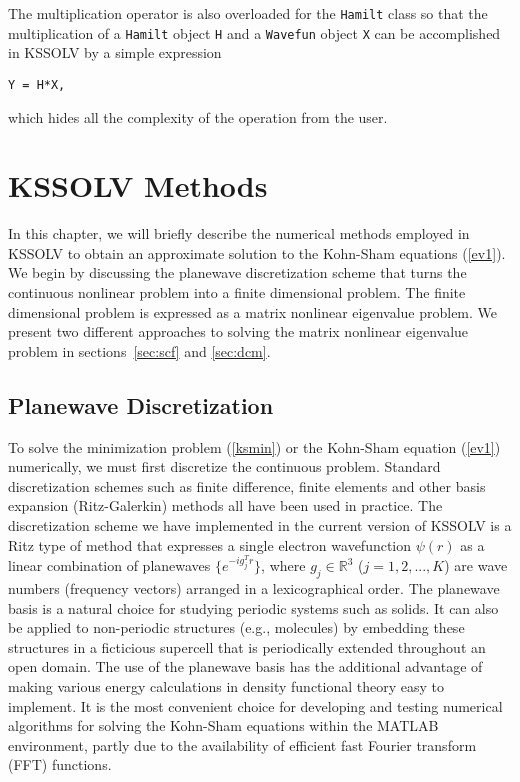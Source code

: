 \documentclass[11pt]{book}
\begin{document}
The multiplication operator is also overloaded for the {\tt Hamilt} class
so that the multiplication of a {\tt Hamilt} object {\tt H} and 
a {\tt Wavefun} object {\tt X} can be accomplished in KSSOLV
by a simple expression
\begin{verbatim}
Y = H*X,
\end{verbatim}
which hides all the complexity of the operation from
the user.


\chapter{KSSOLV Methods} \label{chap:methods}
In this chapter, we will briefly describe the numerical methods employed in
KSSOLV to obtain an approximate solution to the Kohn-Sham equations 
(\ref{ev1}).  We begin by discussing the planewave
discretization scheme that turns the continuous nonlinear problem 
into a finite dimensional problem.  The finite dimensional problem 
is expressed as a matrix nonlinear eigenvalue problem.  We present 
two different approaches to solving the matrix nonlinear eigenvalue problem 
in sections~\ref{sec:scf} and \ref{sec:dcm}. 

\section{Planewave Discretization}\label{sec:pwdiscretize}
To solve the minimization problem (\ref{ksmin}) or the Kohn-Sham equation 
(\ref{ev1}) numerically, we must first discretize the continuous problem.
Standard discretization schemes such as finite difference,
finite elements and other basis expansion (Ritz-Galerkin) methods 
\cite{ritz} all have been used in practice.  The discretization scheme we have 
implemented in the current version of KSSOLV is a Ritz type of method that 
expresses a single electron wavefunction $\psi(r)$ as a linear combination 
of planewaves $\{e^{-ig_j^Tr}\}$, where $g_j \in \mathbb{R}^3$ ($j =
1,2,...,K$) are wave numbers (frequency vectors) arranged in a 
lexicographical order.  
The planewave basis is a natural choice for studying periodic systems such 
as solids.  It can also be applied to non-periodic structures (e.g., molecules)
by embedding these structures in a ficticious supercell \cite{payne:92} that 
is periodically extended throughout an open domain.  The use of the planewave 
basis has the additional advantage of making various energy calculations in 
density functional theory easy to implement.  It is the most convenient 
choice for developing and testing numerical algorithms for solving 
the Kohn-Sham equations within the MATLAB environment, partly due to the 
availability of efficient fast Fourier transform (FFT) functions. 
\end{document}
